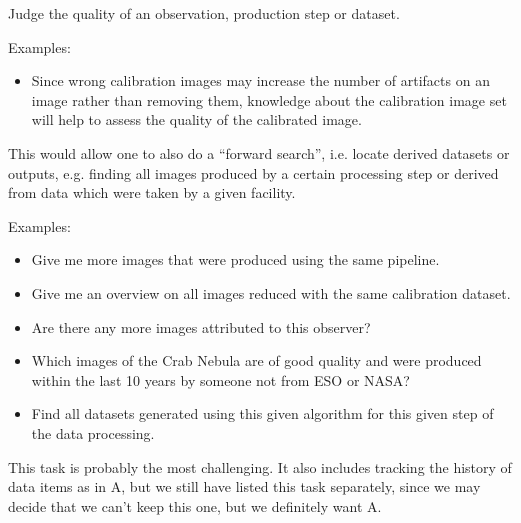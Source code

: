         Judge the quality of an observation, production step or dataset.
        
        \noindent Examples:
        \begin{itemize}
            \item Since wrong calibration images may increase the
number of artifacts on an image rather than removing them, knowledge about
the calibration image set will help to assess the quality of the calibrated
image.  
        \end{itemize}
      

        This would allow one to also do a ``forward search'', i.e. locate derived datasets or outputs, e.g. finding all images produced by a certain processing step or derived from data which were taken by a given facility.
        
        \noindent Examples:
        \begin{itemize}
            \item Give me more images that were produced using the same pipeline.  
            \item Give me an overview on all images reduced with the same calibration dataset.  
            \item Are there any more images attributed to this observer?  
            \item Which images of the Crab Nebula are of good quality and were produced within the last 10 years by someone not from ESO or NASA?
            \item Find all datasets generated using this given algorithm for this given step of the data processing.
        \end{itemize}

        This task is probably the most challenging. It also includes tracking the history of data items as in A, but we still have listed this task separately, since we may decide that we can't keep this one, but we definitely want A.
